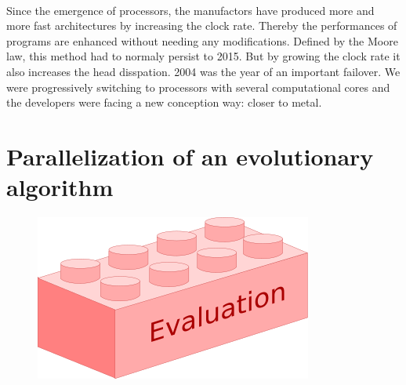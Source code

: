 \paragraph{}

Since the emergence of processors, the manufactors have produced more and more fast architectures by increasing the clock rate. Thereby the performances of programs are enhanced without needing any modifications. Defined by the Moore law, this method had to normaly persist to 2015. But by growing the clock rate it also increases the head disspation. 2004 was the year of an important failover. We were progressively switching to processors with several computational cores and the developers were facing a new conception way: closer to metal.

\section{}


\section{Parallelization of an evolutionary algorithm}

\begin{figure}[H]
  \centering
  \includegraphics[scale=0.5]{images/evaluation_box}
\end{figure}

